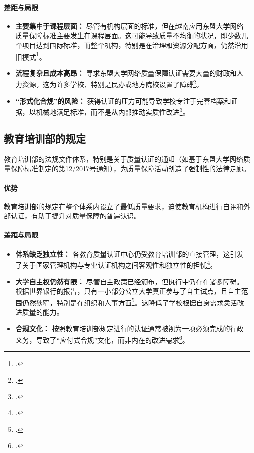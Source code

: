 \paragraph{差距与局限}
\begin{itemize}
    \item \textbf{主要集中于课程层面：} 尽管有机构层面的标准，但在越南应用东盟大学网络质量保障标准主要发生在课程层面。这可能导致质量不均衡的状况，即少数几个项目达到国际标准，而整个机构，特别是在治理和资源分配方面，仍然沿用旧模式\footcite{aun_institutional_v2}。
    \item \textbf{流程复杂且成本高昂：} 寻求东盟大学网络质量保障认证需要大量的财政和人力资源，这为许多学校，特别是民办或地方院校设置了障碍\footcite{stdjssh_637}。
    \item \textbf{“形式化合规”的风险：} 获得认证的压力可能导致学校专注于完善档案和证据，以机械地满足标准，而不是从内部推动实质性改进\footcite{pmc_article_9127449}。
\end{itemize}

\subsection{教育培训部的规定}
教育培训部的法规文件体系，特别是关于质量认证的通知（如基于东盟大学网络质量保障标准制定的第12/2017号通知），为质量保障活动创造了强制性的法律走廊。

\paragraph{优势} 教育培训部的规定在整个体系内设立了最低质量要求，迫使教育机构进行自评和外部认证，有助于提升对质量保障的普遍认识。

\paragraph{差距与局限}
\begin{itemize}
    \item \textbf{体系缺乏独立性：} 各教育质量认证中心仍受教育培训部的直接管理，这引发了关于国家管理机构与专业认证机构之间客观性和独立性的担忧\footcite{ncdt_journal_219}。
    \item \textbf{大学自主权仍然有限：} 尽管自主政策已经颁布，但执行中仍存在诸多障碍。根据世界银行的报告，只有一小部分公立大学真正参与了自主试点，且自主范围仍然狭窄，特别是在组织和人事方面\footcite{worldbank_improvingperformance}。这降低了学校根据自身需求灵活改进质量的能力。
    \item \textbf{合规文化：} 按照教育培训部规定进行的认证通常被视为一项必须完成的行政义务，导致了“应付式合规”文化，而非内在的改进需求\footcite{vjol_reactiveculture}。
\end{itemize}

